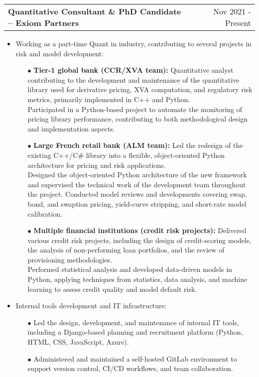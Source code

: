 \documentclass[a4paper,12pt]{article}
\makeatletter
\newenvironment{joblong}[2]
    {
    \begin{tabularx}{\linewidth}{@{}l X r@{}}
    \textbf{#1} & \hfill &  #2 \\[3.75pt]
    \end{tabularx}
    \begin{minipage}[t]{\linewidth}
    \begin{itemize}[nosep,after=\strut, leftmargin=1em, itemsep=3pt,label=--]
    }
    {
    \end{itemize}
    \end{minipage}    
    }
\makeatother
\begin{document}
\begin{joblong}{Quantitative Consultant \& PhD Candidate -- Exiom Partners}{Nov 2021 - Present}
	\item Working as a part-time Quant in industry, contributing to several projects in risk and model development:
		\begin{itemize}
			\item[$\bullet$] \textbf{Tier-1 global bank (CCR/XVA team):} 
			Quantitative analyst contributing to the development and maintenance of the quantitative library used for derivative pricing, XVA computation, and regulatory risk metrics, primarily implemented in C++ and Python. \\
			Participated in a Python-based project to automate the monitoring of pricing library performance, contributing to both methodological design and implementation aspects. \\
			\item[$\bullet$] \textbf{Large French retail bank (ALM team):} Led the redesign of the existing C++/C\# library into a flexible, object-oriented Python architecture for pricing and risk applications. \\
			Designed the object-oriented Python architecture of the new framework and supervised the technical work of the development team throughout the project. 
			Conducted model reviews and developments covering swap, bond, and swaption pricing, yield-curve stripping, and short-rate model calibration. \\
			\item[$\bullet$] \textbf{Multiple financial institutions (credit risk projects):} 
			Delivered various credit risk projects, including the design of credit-scoring models, the analysis of non-performing loan portfolios, and the review of provisioning methodologies. \\
			Performed statistical analysis and developed data-driven models in Python, applying techniques from statistics, data analysis, and machine learning to assess credit quality and model default risk. \\
		\end{itemize}
	\item Internal tools development and IT infrastructure:
		\begin{itemize}
			\item[$\bullet$] Led the design, development, and maintenance of internal IT tools, including a Django-based planning and recruitment platform (Python, HTML, CSS, JavaScript, Azure).
			\item[$\bullet$] Administered and maintained a self-hosted GitLab environment to support version control, CI/CD workflows, and team collaboration.
		\end{itemize}
	\end{joblong}
\end{document}
